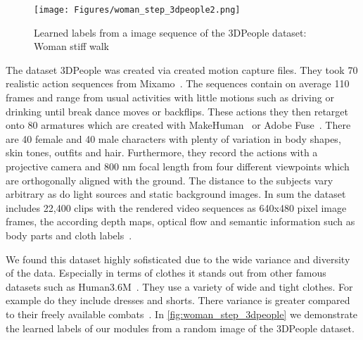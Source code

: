 \begin{figure}
    \centering
    \texttt{[image: Figures/woman\_step\_3dpeople2.png]}
    \decoRule
    \caption[3DPeople]{Learned labels from a image sequence of the 3DPeople dataset: Woman stiff walk}
    \label{fig:woman_step_3dpeople}
\end{figure}


The dataset 3DPeople was created via created motion capture files.
They took 70 realistic action sequences from Mixamo~\cite{mixamomotionpac}.
The sequences contain on average 110 frames and range from usual activities with little motions such as driving
or drinking until break dance moves or backflips.
These actions they then retarget onto 80 armatures which are created with MakeHuman~\cite{makehuman} or Adobe
Fuse~\cite{adobefuse}.
There are 40 female and 40 male characters with plenty of variation in body shapes, skin tones, outfits and hair.
Furthermore, they record the actions with a projective camera and 800 nm focal length from four different viewpoints
which are orthogonally aligned with the ground.
The distance to the subjects vary arbitrary as do light sources and static background images.
In sum the dataset includes 22,400 clips with the rendered video sequences as 640x480 pixel image frames, the according
depth maps, optical flow and semantic information such as body parts and cloth labels~\cite{3dpeople}.

We found this dataset highly sofisticated due to the wide variance and diversity of the data.
Especially in terms of clothes it stands out from other famous datasets such as Human3.6M~\cite{humaneva}.
They use a variety of wide and tight clothes. For example do they include dresses and shorts.
There variance is greater compared to their freely available combats~\cite{human36m, humaneva}.
In \autoref{fig:woman_step_3dpeople} we demonstrate the learned labels of our modules from a random image of the
3DPeople dataset.





